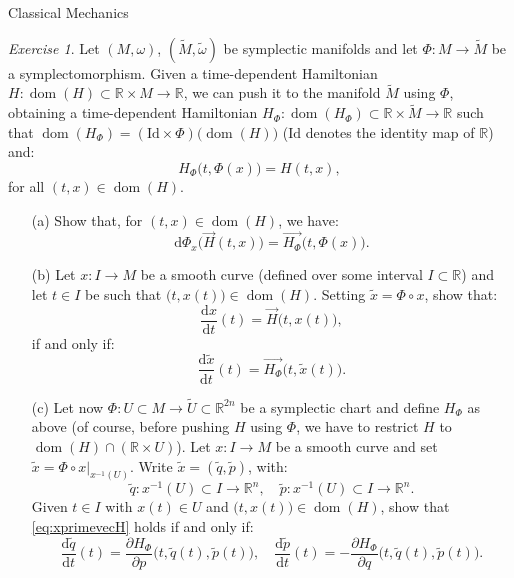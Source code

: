 \documentclass[oneside,a4paper,11pt]{amsbook}
\newcommand{\R}{\mathds R}
\newcommand{\dd}{\mathrm d}
\newcommand{\Id}{\mathrm{Id}}
\DeclareMathOperator{\Dom}{dom}
\theoremstyle{remark}\newtheorem{exercise}{Exercise}[chapter]
\theoremstyle{plain}\newtheorem{teo}{Theorem}[section]
\theoremstyle{plain}\newtheorem{lem}[teo]{Lemma}
\theoremstyle{plain}\newtheorem{prop}[teo]{Proposition}
\theoremstyle{plain}\newtheorem{cor}[teo]{Corollary}
\theoremstyle{definition}\newtheorem{defin}[teo]{Definition}
\theoremstyle{remark}\newtheorem{rem}[teo]{Remark}
\theoremstyle{definition}\newtheorem{notation}[teo]{Notation}
\theoremstyle{definition}\newtheorem{convention}[teo]{Convention}
\theoremstyle{definition}\newtheorem{example}[teo]{Example}
\numberwithin{section}{chapter}
\numberwithin{equation}{section}
\begin{document}
\begin{chapter}{Classical Mechanics}
\begin{exercise}\label{exe:Hamiltcoords}
Let $(M,\omega)$, $(\widetilde M,\tilde\omega)$ be symplectic manifolds and let $\Phi:M\to\widetilde M$ be a symplectomorphism. Given
a time-dependent Hamiltonian $H:\Dom(H)\subset\R\times M\to\R$, we can push it to the manifold
$\widetilde M$ using $\Phi$, obtaining a time-dependent Hamiltonian
$H_\Phi:\Dom(H_\Phi)\subset\R\times\widetilde M\to\R$ such that $\Dom(H_\Phi)=(\Id\times\Phi)\big(\!\Dom(H)\big)$
($\Id$ denotes the identity map of $\R$) and:
\[H_\Phi\big(t,\Phi(x)\big)=H(t,x),\]
for all $(t,x)\in\Dom(H)$.
\begin{itemize}
\item[(a)] Show that, for $(t,x)\in\Dom(H)$, we have:
\[\dd\Phi_x\big(\vec H(t,x)\big)=\overrightarrow{H_\Phi}\big(t,\Phi(x)\big).\]
\item[(b)] Let $x:I\to M$ be a smooth curve (defined over some interval $I\subset\R$) and let $t\in I$ be such that $\big(t,x(t)\big)\in\Dom(H)$.
Setting $\tilde x=\Phi\circ x$, show that:
\begin{equation}\label{eq:xprimevecH}
\frac{\dd x}{\dd t}(t)=\vec H\big(t,x(t)\big),
\end{equation}
if and only if:
\[\frac{\dd\tilde x}{\dd t}(t)=\overrightarrow{H_\Phi}\big(t,\tilde x(t)\big).\]
\item[(c)] Let now $\Phi:U\subset M\to\widetilde U\subset\R^{2n}$ be a symplectic chart and define $H_\Phi$ as above (of course,
before pushing $H$ using $\Phi$, we have to restrict $H$ to $\Dom(H)\cap(\R\times U)$).
Let $x:I\to M$ be a smooth curve and set
$\tilde x=\Phi\circ x\vert_{x^{-1}(U)}$. Write $\tilde x=(\tilde q,\tilde p)$, with:
\[\tilde q:x^{-1}(U)\subset I\longrightarrow\R^n,\quad\tilde p:x^{-1}(U)\subset I\longrightarrow\R^n.\]
Given $t\in I$ with $x(t)\in U$ and $\big(t,x(t)\big)\in\Dom(H)$, show that \eqref{eq:xprimevecH} holds if and only if:
\[\frac{\dd\tilde q}{\dd t}(t)=\frac{\partial H_\Phi}{\partial p}\big(t,\tilde q(t),\tilde p(t)\big),\quad
\frac{\dd\tilde p}{\dd t}(t)=-\frac{\partial H_\Phi}{\partial q}\big(t,\tilde q(t),\tilde p(t)\big).\]
\end{itemize}
\end{exercise}


\end{chapter}
\end{document}
